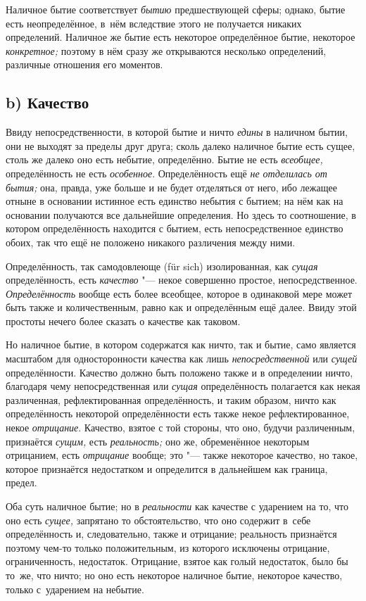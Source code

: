 Наличное бытие соответствует {\em бытию} предшествующей сферы; однако, бытие
есть неопределённое, в~нём вследствие этого не получается никаких определений.
Наличное же бытие есть некоторое определённое бытие, некоторое
{\em конкретное;} поэтому в нём сразу же открываются несколько определений,
различные отношения его моментов.

\subsection[b) Качество]{b) Качество}

Ввиду непосредственности, в которой бытие и ничто
{\em едины} в наличном бытии, они не выходят за пределы
друг друга; сколь далеко наличное бытие есть сущее, столь же далеко оно
есть небытие, определённо. Бытие не есть {\em всеобщее,}
определённость не есть {\em особенное}. Определённость
ещё {\em не отделилась от бытия;} она, правда, уже
больше и не будет отделяться от него, ибо лежащее отныне в основании
истинное есть единство небытия с бытием; на нём как на основании получаются
все дальнейшие определения. Но здесь то соотношение, в котором
определённость находится с бытием, есть непосредственное единство обоих,
так что ещё не положено никакого различения между ними.

Определённость, так самодовлеюще (für sich) изолированная, как
{\em сущая} определённость, есть
{\em качество} "--- некое совершенно простое,
непосредственное. {\em Определённость} вообще есть
более всеобщее, которое в одинаковой мере может быть также и
количественным, равно как и определённым ещё далее. Ввиду этой простоты
нечего более сказать о качестве как таковом.

Но наличное бытие, в котором содержатся как ничто, так и бытие, само
является масштабом для односторонности качества как лишь
{\em непосредственной} или {\em сущей} определённости. Качество должно быть
положено также и в определении ничто, благодаря чему непосредственная или
{\em сущая} определённость полагается как некая
различенная, рефлектированная определённость, и таким образом, ничто как
определённость некоторой определённости есть также некое рефлектированное,
некое {\em отрицание}. Качество, взятое с той стороны,
что оно, будучи различенным, признаётся {\em сущим,}
есть {\em реальность;} оно же, обременённое некоторым
отрицанием, есть {\em отрицание} вообще; это "--- также
некоторое качество, но такое, которое признаётся недостатком и определится
в дальнейшем как граница, предел.

Оба суть наличное бытие; но в {\em реальности} как качестве с ударением на то,
что оно есть {\em сущее,} запрятано то обстоятельство, что оно содержит в~себе
определённость и, следовательно, также и отрицание; реальность признаётся
поэтому чем-то только положительным, из которого исключены отрицание,
ограниченность, недостаток. Отрицание, взятое как голый недостаток, было бы
то~же, что ничто; но оно есть некоторое наличное бытие, некоторое качество,
только с~ударением на небытие.

